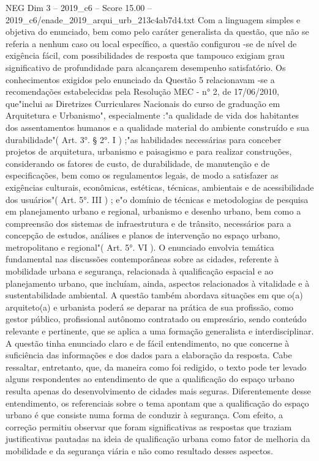 \begin{textsample}{NEG Dim 3 – 2019\_c6 – Score 15.00 – 2019\_c6/enade\_2019\_arqui\_urb\_213c4ab7d4.txt}
Com a linguagem simples e objetiva do enunciado, bem como pelo caráter generalista da questão, que não se referia a nenhum caso ou local específico, a questão configurou -se de nível de exigência fácil, com possibilidades de resposta que tampouco exigiam grau significativo de profundidade para alcançarem desempenho satisfatório.
Os conhecimentos exigidos pelo enunciado da Questão 5 relacionavam -se a recomendações estabelecidas pela Resolução MEC - n{\EmojiFont °} 2, de 17/06/2010, que"inclui as Diretrizes Curriculares Nacionais do curso de graduação em Arquitetura e Urbanismo", especialmente :"a qualidade de vida dos habitantes dos assentamentos humanos e a qualidade material do ambiente construído e sua durabilidade"( Art. 3{\EmojiFont °}. § 2{\EmojiFont °}.
I ) ;"as habilidades necessárias para conceber projetos de arquitetura, urbanismo e paisagismo e para realizar construções, considerando os fatores de custo, de durabilidade, de manutenção e de especificações, bem como os regulamentos legais, de modo a satisfazer as exigências culturais, econômicas, estéticas, técnicas, ambientais e de acessibilidade dos usuários"( Art. 5{\EmojiFont °}.
III ) ; e"o domínio de técnicas e metodologias de pesquisa em planejamento urbano e regional, urbanismo e desenho urbano, bem como a compreensão dos sistemas de infraestrutura e de trânsito, necessários para a concepção de estudos, análises e planos de intervenção no espaço urbano, metropolitano e regional"( Art. 5{\EmojiFont °}.
VI ).
O enunciado envolvia temática fundamental nas discussões contemporâneas sobre as cidades, referente à mobilidade urbana e segurança, relacionada à qualificação espacial e ao planejamento urbano, que incluíam, ainda, aspectos relacionados à vitalidade e à sustentabilidade ambiental.
A questão também abordava situações em que o(a) arquiteto(a) e urbanista poderá se deparar na prática de sua profissão, como gestor público, profissional autônomo contratado ou empresário, sendo conteúdo relevante e pertinente, que se aplica a uma formação generalista e interdisciplinar.
A questão tinha enunciado claro e de fácil entendimento, no que concerne à suficiência das informações e dos dados para a elaboração da resposta.
Cabe ressaltar, entretanto, que, da maneira como foi redigido, o texto pode ter levado alguns respondentes ao entendimento de que a qualificação do espaço urbano resulta apenas do desenvolvimento de cidades mais seguras.
Diferentemente desse entendimento, os referenciais sobre o tema apontam que a qualificação do espaço urbano é que consiste numa forma de conduzir à segurança.
Com efeito, a correção permitiu observar que foram significativas as respostas que traziam justificativas pautadas na ideia de qualificação urbana como fator de melhoria da mobilidade e da segurança viária e não como resultado desses aspectos.

\end{textsample}
